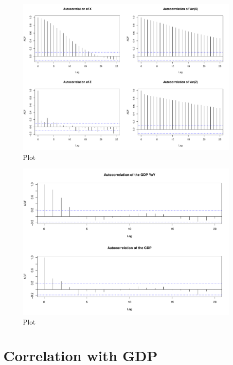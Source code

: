 \documentclass[12pt,a4paper,oneside]{book}
\begin{document}
\begin{figure}[H]
    \centering
    \captionsetup{justification=centering}
    \includegraphics[scale=0.5]{Graphs/ACF.pdf}
    \caption{Plot }
    \label{A_corplot}
\end{figure}

\begin{figure}[H]
    \centering
    \captionsetup{justification=centering}
    \includegraphics[scale=0.45]{Graphs/ACF_GDP.pdf}
    \caption{Plot }
    \label{A_corplot}
\end{figure}



\section{Correlation with GDP}
\end{document}

